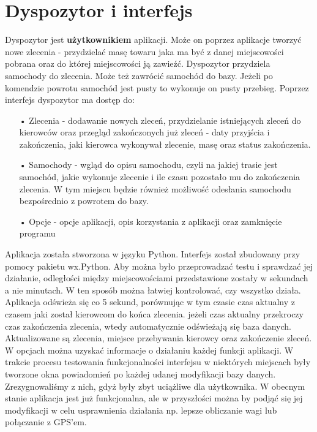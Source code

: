 \documentclass[11pt,a4paper]{mwart}
\begin{document}
\section{Dyspozytor i interfejs}
Dyspozytor jest \textbf{użytkownikiem} aplikacji. Może on poprzez aplikacje tworzyć nowe zlecenia - przydzielać masę towaru jaka ma być z danej miejscowości pobrana oraz do której miejscowości ją zawieźć. Dyspozytor przydziela samochody do zlecenia. Może też zawrócić samochód do bazy. Jeżeli po komendzie powrotu samochód jest pusty to wykonuje on pusty przebieg. 
Poprzez interfejs dyspozytor ma dostęp do:
\begin{flushleft}
\begin{enumerate}
\item[• Zlecenia] - dodawanie nowych zleceń, przydzielanie istniejących zleceń do kierowców oraz przegląd zakończonych już zleceń - daty przyjścia i zakończenia, jaki kierowca wykonywał zlecenie, masę oraz status zakończenia.
\item[• Samochody] - wgląd do opisu samochodu, czyli na jakiej trasie jest samochód, jakie wykonuje zlecenie i ile czasu pozostało mu do zakończenia zlecenia. W tym miejscu będzie również możliwość odesłania samochodu bezpośrednio z powrotem do bazy.
\item[• Opcje] - opcje aplikacji, opis korzystania z aplikacji oraz zamknięcie programu
\end{enumerate}
\end{flushleft}
Aplikacja została stworzona w języku Python. Interfejs został zbudowany przy pomocy pakietu wx.Python. Aby można było przeprowadzać testu i sprawdzać jej działanie, odległości między miejscowościami przedstawione zostały w sekundach a nie minutach. W ten sposób można łatwiej kontrolować, czy wszystko działa. Aplikacja odświeża się co 5 sekund, porównując w tym czasie czas aktualny z czasem jaki został kierowcom do końca zlecenia. jeżeli czas aktualny przekroczy czas zakończenia zlecenia, wtedy automatycznie odświeżają się baza danych. Aktualizowane są zlecenia, miejsce przebywania kierowcy oraz zakończenie zleceń. W opcjach można uzyskać informacje o działaniu każdej funkcji aplikacji.
W trakcie procesu testowania funkcjonalności interfejsu w niektórych miejscach były tworzone okna powiadomień po każdej udanej modyfikacji bazy danych. Zrezygnowaliśmy z nich, gdyż były zbyt uciążliwe dla użytkownika. W obecnym stanie aplikacja jest już funkcjonalna, ale w przyszłości można by podjąć się jej modyfikacji w celu usprawnienia działania np. lepsze obliczanie wagi lub połączanie z GPS'em. 
\end{document}

